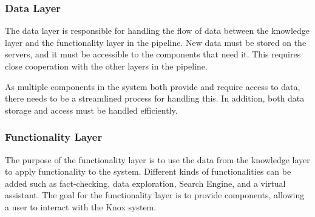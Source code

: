 \subsubsection{Data Layer}\label{databaseResponsibility}
The data layer is responsible for handling the flow of data between the knowledge layer and the functionality layer in the \knox{} pipeline.
New data must be stored on the servers, and it must be accessible to the components that need it. 
This requires close cooperation with the other layers in the pipeline.


As multiple components in the \knox{} system both provide and require access to data, there needs to be a streamlined process for handling this.
In addition, both data storage and access must be handled efficiently.

\subsubsection{Functionality Layer}
The purpose of the functionality layer is to use the data from the knowledge layer to apply functionality to the system.
Different kinds of functionalities can be added such as fact-checking, data exploration, Search Engine, and a virtual assistant.
 The goal for the functionality layer is to provide components, allowing a user to interact with the Knox system. 
